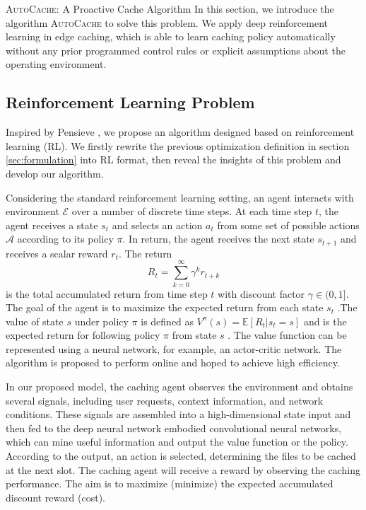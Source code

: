 \documentclass{article}
\begin{document}
\begin{section}{\textsc{AutoCache}: A Proactive Cache Algorithm}
    \label{sec:algorithm}
    In this section, we introduce the algorithm \textsc{AutoCache} to solve this problem. We apply deep reinforcement learning in edge caching, which is able to learn caching policy automatically without any prior programmed control rules or explicit assumptions about the operating environment.

    \subsection{Reinforcement Learning Problem}
    Inspired by Pensieve \cite{Pensieve}, we propose an algorithm designed based on reinforcement learning (RL). We firstly rewrite the previous optimization definition in section \ref{sec:formulation} into RL format, then reveal the insights of this problem and develop our algorithm.

    Considering the standard reinforcement learning setting, an agent interacts with environment $\mathcal{E}$ over a number of discrete time steps. At each time step $t$, the agent receives a state $s_t$ and selects an action $a_t$ from some set of possible actions $\mathcal{A}$ according to its policy $\pi$. In return, the agent receives the next state $s_{t+1}$ and receives a scalar reward $r_t$. The return
    $$
    R_t=\sum_{k=0}^{\infty}\gamma^k r_{t+k}
    $$
    is the total accumulated return from time step $t$ with discount factor $\gamma\in(0,1]$. The goal of the agent is to maximize the expected return from each state $s_t$ \cite{rl-intro}.The value of state $s$ under policy $\pi$ is defined as $V^{\pi}(s)=\mathbb{E}[R_t|s_t=s]$ and is the expected return for following policy $\pi$ from state $s$ \cite{DBLP:journals/corr/MnihBMGLHSK16}. The value function can be represented using a neural network, for example, an actor-critic network. The algorithm is proposed to perform online and hoped to achieve high efficiency.

    In our proposed model, the caching agent observes the environment and obtains several signals, including user requests, context information, and network conditions. These signals are assembled into a high-dimensional state input and then fed to the deep neural network embodied convolutional neural networks, which can mine useful information and output the value function or the policy. According to the output, an action is selected, determining the files to be cached at the next slot. The caching agent will receive a reward by observing the caching performance. The aim is to maximize (minimize) the expected accumulated discount reward (cost).


\end{section}
\end{document}
